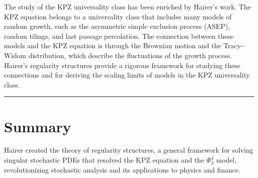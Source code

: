 The study of the KPZ universality class has been enriched by Hairer's work. The KPZ equation belongs to a universality class that includes many models of random growth, such as the asymmetric simple exclusion process (ASEP), random tilings, and last passage percolation. The connection between these models and the KPZ equation is through the Brownian motion and the Tracy-Widom distribution, which describe the fluctuations of the growth process. Hairer's regularity structures provide a rigorous framework for studying these connections and for deriving the scaling limits of models in the KPZ universality class.

\begin{center}\rule{0.5\linewidth}{0.5pt}\end{center}

\section*{Summary}

Hairer created the theory of regularity structures, a general framework for solving singular stochastic PDEs that resolved the KPZ equation and the $\Phi^4_3$ model, revolutionizing stochastic analysis and its applications to physics and finance.
